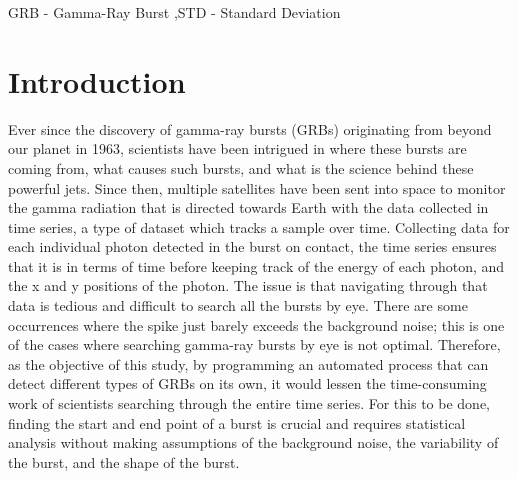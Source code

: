 \documentclass[final,5p,times,twocolumn,authoryear]{elsarticle}
\begin{document}
\begin{frontmatter}


\begin{keyword}
GRB - Gamma-Ray Burst \sep STD - Standard Deviation



\end{keyword}


\end{frontmatter}




\section{Introduction}
Ever since the discovery of gamma-ray bursts (GRBs) originating from beyond our planet in 1963, scientists have been intrigued in where these bursts are coming from, what causes such bursts, and what is the science behind these powerful jets. Since then, multiple satellites have been sent into space to monitor the gamma radiation that is directed towards Earth with the data collected in time series, a type of dataset which tracks a sample over time. Collecting data for each individual photon detected in the burst on contact, the time series ensures that it is in terms of time before keeping track of the energy of each photon, and the x and y positions of the photon. The issue is that navigating through  that data is tedious and difficult to search all the bursts by eye. There are some occurrences where the spike just barely exceeds the background noise; this is one of the cases where searching gamma-ray bursts by eye is not optimal. Therefore, as the objective of this study, by programming an automated process that can detect different types of GRBs on its own, it would lessen the time-consuming work of scientists searching through the entire time series. For this to be done, finding the start and end point of a burst is crucial and requires statistical analysis without making assumptions of the background noise, the variability of the burst, and the shape of the burst.
\end{document}
